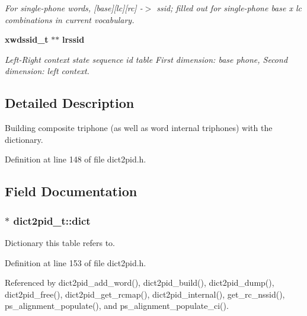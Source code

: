 \begin{DoxyCompactItemize}
\begin{DoxyCompactList}\small\item\em \-For single-\/phone words, [base][lc][rc] -\/$>$ ssid; filled out for single-\/phone base x lc combinations in current vocabulary. \end{DoxyCompactList}\item 
{\bf xwdssid\-\_\-t} $\ast$$\ast$ {\bf lrssid}\label{structdict2pid__t_a6c1de8a269f6ff37dce3dd8cbec4235a}

\begin{DoxyCompactList}\small\item\em \-Left-\/\-Right context state sequence id table \-First dimension\-: base phone, \-Second dimension\-: left context. \end{DoxyCompactList}\end{DoxyCompactItemize}


\subsection{\-Detailed \-Description}
\-Building composite triphone (as well as word internal triphones) with the dictionary. 

\-Definition at line 148 of file dict2pid.\-h.



\subsection{\-Field \-Documentation}
\subsubsection[{dict}]{$\ast$ {\bf dict2pid\-\_\-t\-::dict}}\label{structdict2pid__t_ae1fecad64884980e9d8355844abc3512}


\-Dictionary this table refers to. 



\-Definition at line 153 of file dict2pid.\-h.



\-Referenced by dict2pid\-\_\-add\-\_\-word(), dict2pid\-\_\-build(), dict2pid\-\_\-dump(), dict2pid\-\_\-free(), dict2pid\-\_\-get\-\_\-rcmap(), dict2pid\-\_\-internal(), get\-\_\-rc\-\_\-nssid(), ps\-\_\-alignment\-\_\-populate(), and ps\-\_\-alignment\-\_\-populate\-\_\-ci().

